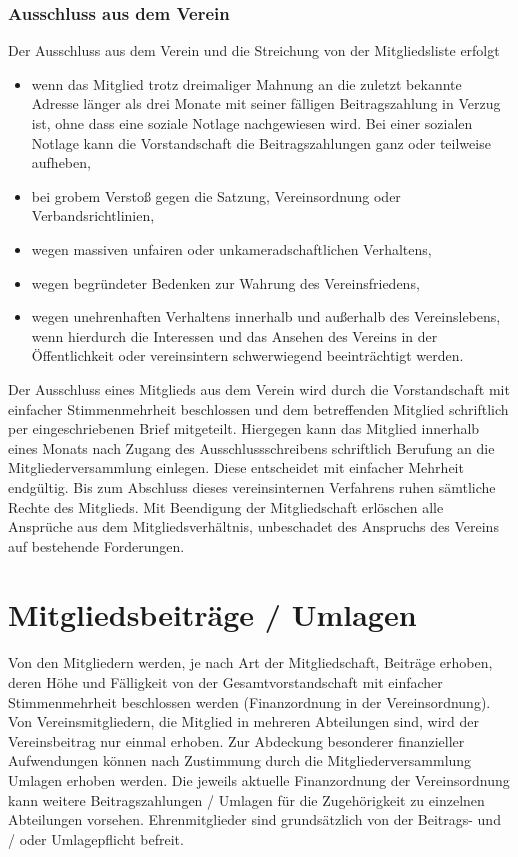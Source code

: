 \documentclass[10pt,a4paper]{article}
\begin{document}
\subsubsection{Ausschluss aus dem Verein}
Der Ausschluss aus dem Verein und die Streichung von der Mitgliedsliste erfolgt
\begin{itemize}
\item wenn das Mitglied trotz dreimaliger Mahnung an die zuletzt bekannte Adresse
länger als drei Monate mit seiner fälligen Beitragszahlung in Verzug ist, ohne 
dass eine soziale Notlage nachgewiesen wird. Bei einer sozialen Notlage kann die
Vorstandschaft die Beitragszahlungen ganz oder teilweise aufheben,
\item bei grobem Verstoß gegen die Satzung, Vereinsordnung oder
Verbandsrichtlinien,
\item wegen massiven unfairen oder unkameradschaftlichen Verhaltens,
\item wegen begründeter Bedenken zur Wahrung des Vereinsfriedens,
\item wegen unehrenhaften Verhaltens innerhalb und außerhalb des Vereinslebens,
wenn hierdurch die Interessen und das Ansehen des Vereins in der Öffentlichkeit
oder vereinsintern schwerwiegend beeinträchtigt werden.
\end{itemize}

Der Ausschluss eines Mitglieds aus dem Verein wird durch die Vorstandschaft mit einfacher Stimmenmehrheit
beschlossen und dem betreffenden Mitglied schriftlich per eingeschriebenen Brief mitgeteilt. Hiergegen kann das
Mitglied innerhalb eines Monats nach Zugang des Ausschlussschreibens schriftlich Berufung an die
Mitgliederversammlung einlegen. Diese entscheidet mit einfacher Mehrheit endgültig. Bis zum Abschluss dieses
vereinsinternen Verfahrens ruhen sämtliche Rechte des Mitglieds.
Mit Beendigung der Mitgliedschaft erlöschen alle Ansprüche aus dem Mitgliedsverhältnis, unbeschadet des
Anspruchs des Vereins auf bestehende Forderungen.
\section{Mitgliedsbeiträge / Umlagen}
Von den Mitgliedern werden, je nach Art der Mitgliedschaft, Beiträge erhoben, deren Höhe und Fälligkeit von
der Gesamtvorstandschaft mit einfacher Stimmenmehrheit beschlossen werden (Finanzordnung in der
Vereinsordnung). Von Vereinsmitgliedern, die Mitglied in mehreren Abteilungen sind, wird der Vereinsbeitrag
nur einmal erhoben.
Zur Abdeckung besonderer finanzieller Aufwendungen können nach Zustimmung durch die
Mitgliederversammlung Umlagen erhoben werden.
Die jeweils aktuelle Finanzordnung der Vereinsordnung kann weitere Beitragszahlungen / Umlagen für die
Zugehörigkeit zu einzelnen Abteilungen vorsehen.
Ehrenmitglieder sind grundsätzlich von der Beitrags- und / oder Umlagepflicht befreit.
\end{document}
